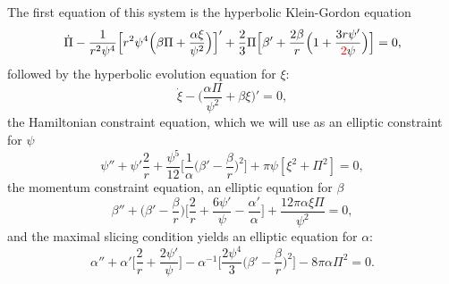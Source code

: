 \documentclass[12pt]{article}
\numberwithin{equation}{section}
\newcommand{\redtext}[1]{\textcolor{red}{#1}}
\begin{document}
The first equation of this system is the hyperbolic Klein-Gordon equation
\begin{equation} \label{eq:hyperbolic_KGE}
\dot{\Pi} - \frac{1}{r^2 \psi^4} \Big[ r^2 \psi^4 \Big( \beta \Pi + \frac{\alpha \xi}{\psi^2} \Big)\Big]' + \frac{2}{3} \Pi \Big[ \beta' + \frac{2 \beta}{r} \Big(1 + \frac{3 r \psi'}{\redtext{2} \psi} \Big) \Big] = 0,
\end{equation}
followed by the hyperbolic evolution equation for $\xi$:
\begin{equation} \label{eq:xi_evol}
\dot{\xi} - \Big( \frac{\alpha \Pi}{\psi^2} + \beta \xi \Big)' = 0,
\end{equation}
the Hamiltonian constraint equation, which we will use as an elliptic constraint for $\psi$
\begin{equation} \label{eq:psi_evol}
\psi'' + \psi' \frac{2}{r} + \frac{\psi^5}{12} \Big[ \frac{1}{\alpha} \Big( \beta' - \frac{\beta}{r} \Big)^2 \Big] + \pi \psi [\xi^2 + \Pi^2] = 0,
\end{equation}
the momentum constraint equation, an elliptic equation for $\beta$
\begin{equation} \label{eq:beta_evol}
\beta'' + \Big( \beta' - \frac{\beta}{r} \Big) \Big[ \frac{2}{r} + \frac{6 \psi'}{\psi} - \frac{\alpha'}{\alpha} \Big] + \frac{12 \pi \alpha \xi \Pi}{\psi^2} = 0,
\end{equation}
and the maximal slicing condition yields an elliptic equation for $\alpha$:
\begin{equation} \label{eq:alpha_evol}
\alpha'' + \alpha' \Big[ \frac{2}{r} + \frac{2 \psi'}{\psi} \Big] - \alpha^{-1} \Big[ \frac{2 \psi^4}{3} \Big( \beta' - \frac{\beta}{r} \Big)^2 \Big] - 8 \pi \alpha \Pi^2 = 0.
\end{equation}
\end{document}
